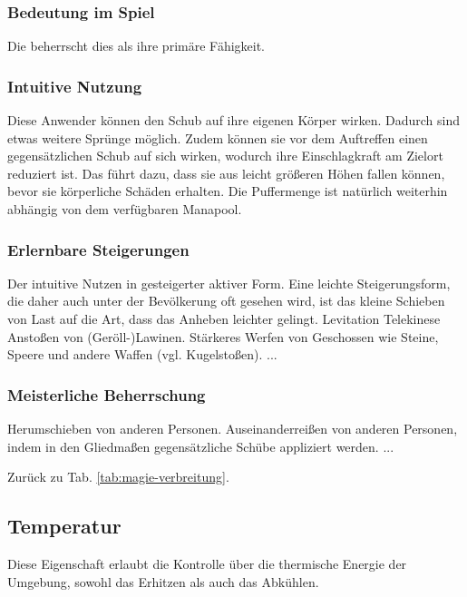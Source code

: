 \subsubsection{Bedeutung im Spiel}
Die  beherrscht dies als ihre primäre Fähigkeit.

\subsubsection{Intuitive Nutzung}
Diese Anwender können den Schub auf ihre eigenen Körper wirken.
Dadurch sind etwas weitere Sprünge möglich.
Zudem können sie vor dem Auftreffen einen gegensätzlichen Schub auf sich wirken, wodurch ihre Einschlagkraft am Zielort reduziert ist.
Das führt dazu, dass sie \zB aus leicht größeren Höhen fallen können, bevor sie körperliche Schäden erhalten.
Die Puffermenge ist natürlich weiterhin abhängig von dem verfügbaren Manapool.

\subsubsection{Erlernbare Steigerungen}
\begin{outline}
	\1 Der intuitive Nutzen in gesteigerter aktiver Form.
	\1 Eine leichte Steigerungsform, die daher auch unter der Bevölkerung oft gesehen wird, ist das kleine Schieben von Last auf die Art, dass das Anheben leichter gelingt.
	\1 Levitation
	\1 Telekinese
	\1 Anstoßen von \zB (Geröll-)Lawinen.
	\1 Stärkeres Werfen von Geschossen wie Steine, Speere und andere Waffen (vgl. Kugelstoßen).
	\1 ...
\end{outline}

\subsubsection{Meisterliche Beherrschung} 
\begin{outline}
	\1 Herumschieben von anderen Personen.
	\1 Auseinanderreißen von anderen Personen, indem in den Gliedmaßen gegensätzliche Schübe appliziert werden.
	\1 ...
\end{outline}
Zurück zu Tab. \ref{tab:magie-verbreitung}.



\subsection{Temperatur}\label{magie:temperatur}
Diese Eigenschaft erlaubt die Kontrolle über die thermische Energie der Umgebung, sowohl das Erhitzen als auch das Abkühlen.

